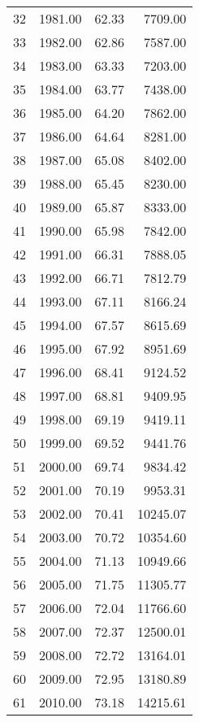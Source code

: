 \begin{longtable}{rrrr}
  32 & 1981.00 & 62.33 & 7709.00 \\ 
  33 & 1982.00 & 62.86 & 7587.00 \\ 
  34 & 1983.00 & 63.33 & 7203.00 \\ 
  35 & 1984.00 & 63.77 & 7438.00 \\ 
  36 & 1985.00 & 64.20 & 7862.00 \\ 
  37 & 1986.00 & 64.64 & 8281.00 \\ 
  38 & 1987.00 & 65.08 & 8402.00 \\ 
  39 & 1988.00 & 65.45 & 8230.00 \\ 
  40 & 1989.00 & 65.87 & 8333.00 \\ 
  41 & 1990.00 & 65.98 & 7842.00 \\ 
  42 & 1991.00 & 66.31 & 7888.05 \\ 
  43 & 1992.00 & 66.71 & 7812.79 \\ 
  44 & 1993.00 & 67.11 & 8166.24 \\ 
  45 & 1994.00 & 67.57 & 8615.69 \\ 
  46 & 1995.00 & 67.92 & 8951.69 \\ 
  47 & 1996.00 & 68.41 & 9124.52 \\ 
  48 & 1997.00 & 68.81 & 9409.95 \\ 
  49 & 1998.00 & 69.19 & 9419.11 \\ 
  50 & 1999.00 & 69.52 & 9441.76 \\ 
  51 & 2000.00 & 69.74 & 9834.42 \\ 
  52 & 2001.00 & 70.19 & 9953.31 \\ 
  53 & 2002.00 & 70.41 & 10245.07 \\ 
  54 & 2003.00 & 70.72 & 10354.60 \\ 
  55 & 2004.00 & 71.13 & 10949.66 \\ 
  56 & 2005.00 & 71.75 & 11305.77 \\ 
  57 & 2006.00 & 72.04 & 11766.60 \\ 
  58 & 2007.00 & 72.37 & 12500.01 \\ 
  59 & 2008.00 & 72.72 & 13164.01 \\ 
  60 & 2009.00 & 72.95 & 13180.89 \\ 
  61 & 2010.00 & 73.18 & 14215.61 \\ 
   \hline
\hline
\end{longtable}
